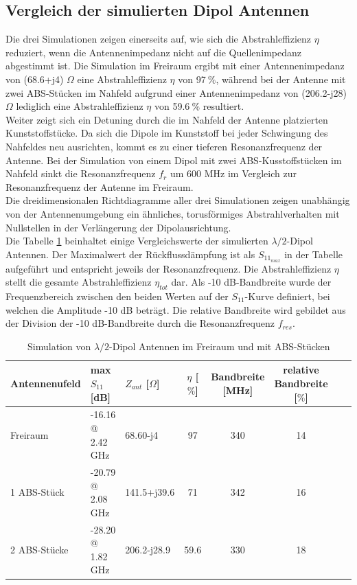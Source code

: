 \subsection{Vergleich der simulierten Dipol Antennen}\label{sec:VerglecihSimDipol}
Die drei Simulationen zeigen einerseits auf, wie sich die Abstrahleffizienz $\eta$ reduziert, wenn die Antennenimpedanz nicht auf die Quellenimpedanz abgestimmt ist. Die Simulation im Freiraum ergibt mit einer Antennenimpedanz von (68.6+j4) $\Omega$ eine Abstrahleffizienz $\eta$ von 97$\ \%$, während bei der Antenne mit zwei ABS-Stücken im Nahfeld aufgrund einer Antennenimpedanz von (206.2-j28) $\Omega$ lediglich eine Abstrahleffizienz $\eta$ von 59.6$\ \%$ resultiert. \\
Weiter zeigt sich ein Detuning durch die im Nahfeld der Antenne platzierten Kunststoffstücke. Da sich die Dipole im Kunststoff bei jeder Schwingung des Nahfeldes neu ausrichten, kommt es zu einer tieferen Resonanzfrequenz der Antenne. Bei der Simulation von einem Dipol mit zwei ABS-Kusstoffstücken im Nahfeld sinkt die Resonanzfrequenz $f_{r}$ um 600 MHz im Vergleich zur Resonanzfrequenz der Antenne im Freiraum.\\ 
Die dreidimensionalen Richtdiagramme aller drei Simulationen zeigen unabhängig von der Antennenumgebung ein ähnliches, torusförmiges Abstrahlverhalten mit Nullstellen in der Verlängerung der Dipolausrichtung.\\
Die Tabelle \ref{tab:Evaluation_Vergeich_Dipol Antennen} beinhaltet einige Vergleichswerte der simulierten $\lambda/2$-Dipol Antennen. Der Maximalwert der Rückflussdämpfung ist als $S_{11_{max}}$ in der Tabelle aufgeführt und entspricht jeweils der Resonanzfrequenz. Die Abstrahleffizienz $\eta$ stellt die gesamte Abstrahleffizienz $\eta_{tot}$ dar. Als -10 dB-Bandbreite wurde der Frequenzbereich zwischen den beiden Werten auf der $S_{11}$-Kurve definiert, bei welchen die Amplitude -10 dB beträgt. Die relative Bandbreite wird gebildet aus der Division der -10 dB-Bandbreite durch die Resonanzfrequenz $f_{res}$.
\begin{table}[!h]
 \begin{tabular}{p{3cm} p{3.5cm} l c c c c r} 
 \toprule 
 Antennenufeld & max $S_{11}$ [dB]		& $Z_{ant}$ [$\Omega$] 	& $\eta$ [$\%$] & Bandbreite [MHz] & relative Bandbreite [$\%$]\\ 
 \midrule
 Freiraum 			&	-16.16 @ 2.42 GHz		& 	68.60-j4			& 	97	&	340 & 14\\ 		
1 ABS-Stück 	& -20.79 @ 2.08 GHz 		&	141.5+j39.6		&	71	&	342	 & 16 \\
2 ABS-Stücke 	& -28.20 @ 1.82 GHz 	&	206.2-j28.9		&	59.6	&	330	 & 18 \\
 \bottomrule
 \end{tabular}
 \caption{Simulation von $\lambda/2$-Dipol Antennen im Freiraum und mit ABS-Stücken}
 \label{tab:Evaluation_Vergeich_Dipol Antennen}
\end{table}

